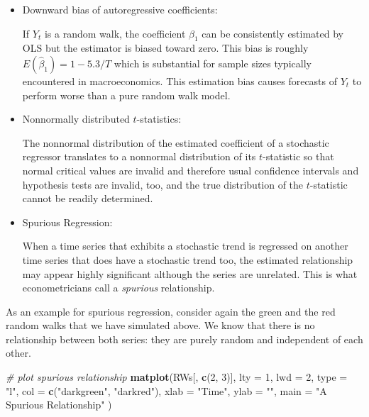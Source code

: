 \documentclass[]{book}
\newenvironment{Shaded}{\begin{snugshade}}{\end{snugshade}}
\newcommand{\KeywordTok}[1]{\textcolor[rgb]{0.13,0.29,0.53}{\textbf{#1}}}
\newcommand{\DataTypeTok}[1]{\textcolor[rgb]{0.13,0.29,0.53}{#1}}
\newcommand{\DecValTok}[1]{\textcolor[rgb]{0.00,0.00,0.81}{#1}}
\newcommand{\StringTok}[1]{\textcolor[rgb]{0.31,0.60,0.02}{#1}}
\newcommand{\CommentTok}[1]{\textcolor[rgb]{0.56,0.35,0.01}{\textit{#1}}}
\newcommand{\NormalTok}[1]{#1}
\theoremstyle{definition}
\theoremstyle{definition}
\theoremstyle{definition}
\theoremstyle{remark}
\begin{document}
\begin{itemize}
\item
  Downward bias of autoregressive coefficients:

  If \(Y_t\) is a random walk, the coefficient \(\beta_1\) can be
  consistently estimated by OLS but the estimator is biased toward zero.
  This bias is roughly \(E(\widehat{\beta}_1) = 1 - 5.3/T\) which is
  substantial for sample sizes typically encountered in macroeconomics.
  This estimation bias causes forecasts of \(Y_t\) to perform worse than
  a pure random walk model.
\item
  Nonnormally distributed \(t\)-statistics:

  The nonnormal distribution of the estimated coefficient of a
  stochastic regressor translates to a nonnormal distribution of its
  \(t\)-statistic so that normal critical values are invalid and
  therefore usual confidence intervals and hypothesis tests are invalid,
  too, and the true distribution of the \(t\)-statistic cannot be
  readily determined.
\item
  Spurious Regression:

  When a time series that exhibits a stochastic trend is regressed on
  another time series that does have a stochastic trend too, the
  estimated relationship may appear highly significant although the
  series are unrelated. This is what econometricians call a
  \emph{spurious} relationship.
\end{itemize}

As an example for spurious regression, consider again the green and the
red random walks that we have simulated above. We know that there is no
relationship between both series: they are purely random and independent
of each other.

\begin{Shaded}
\begin{Highlighting}[]
\CommentTok{# plot spurious relationship}
\KeywordTok{matplot}\NormalTok{(RWs[, }\KeywordTok{c}\NormalTok{(}\DecValTok{2}\NormalTok{, }\DecValTok{3}\NormalTok{)], }
        \DataTypeTok{lty =} \DecValTok{1}\NormalTok{,}
        \DataTypeTok{lwd =} \DecValTok{2}\NormalTok{,}
        \DataTypeTok{type =} \StringTok{"l"}\NormalTok{,}
        \DataTypeTok{col =} \KeywordTok{c}\NormalTok{(}\StringTok{"darkgreen"}\NormalTok{, }\StringTok{"darkred"}\NormalTok{),}
        \DataTypeTok{xlab =} \StringTok{"Time"}\NormalTok{,}
        \DataTypeTok{ylab =} \StringTok{""}\NormalTok{,}
        \DataTypeTok{main =} \StringTok{"A Spurious Relationship"}
\NormalTok{        )    }
\end{Highlighting}
\end{Shaded}
\end{document}
